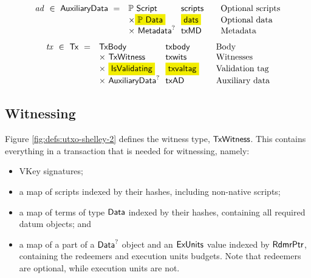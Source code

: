 \begin{figure*}[htb]
\begin{equation*}
  \end{equation*}
  \begin{equation*}
    \begin{array}{r@{~~}l@{~~}l@{\qquad}l}
      \var{ad} ~\in~ \AuxiliaryData ~=~
      & \powerset{\Script} & \fun{scripts}& \text{Optional scripts}\\
      & \times \hldiff{\powerset{\Data}} & \hldiff{\fun{dats}}& \text{Optional data}\\
      & \times ~\Metadata^? & \fun{txMD}&\text{Metadata}
    \end{array}
  \end{equation*}
  \begin{equation*}
    \begin{array}{r@{~~}l@{~~}l@{\qquad}l}
      \var{tx} ~\in~ \Tx ~=~
      & \TxBody & \fun{txbody} & \text{Body}\\
      & \times ~\TxWitness & \fun{txwits} & \text{Witnesses}\\
      & \times ~\hldiff{\IsValidating} & \hldiff{\fun{txvaltag}}&\text{Validation tag}\\
      & \times ~\AuxiliaryData^? & \fun{txAD}&\text{Auxiliary data}\\
    \end{array}
  \end{equation*}
  \caption{Definitions for transactions, cont.}
  \label{fig:defs:utxo-shelley-2}
\end{figure*}

\subsection{Witnessing}
Figure \ref{fig:defs:utxo-shelley-2} defines the witness type, $\mathsf{TxWitness}$.  This contains everything
in a transaction that is needed for witnessing, namely:

\begin{itemize}
  \item VKey signatures;
  \item a map of scripts indexed by their hashes, including non-native scripts;
  \item a map of terms of type $\mathsf{Data}$ indexed by their hashes, containing all required datum objects; and
  \item a map of a part of a $\mathsf{Data}^?$ object and an $\mathsf{ExUnits}$ value indexed by $\mathsf{RdmrPtr}$,
  containing the redeemers and execution units budgets. Note that redeemers are optional, while
  execution units are not. 
\end{itemize}

